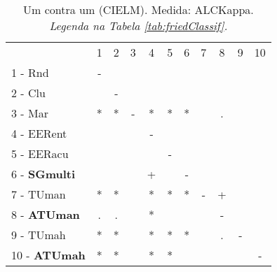 \begin{table}[h]
\caption{Um contra um (CIELM). Medida: ALCKappa. \textit{Legenda na Tabela \ref{tab:friedClassif}.}}
\begin{center}\begin{tabular}{lcc|cc|cc|cc|cc}
 			& 1 & 2 & 3 & 4 & 5 & 6 & 7 & 8 & 9 & 10\\
1 - Rnd  	& - &   &   &   &   &   &   &   &   &   \\
2 - Clu  	&   & - &   &   &   &   &   &   &   &   \\ \hline
3 - Mar  	& * & * & - & * & * & * &   & . &   &   \\
4 - EERent	&   &   &   & - &   &   &   &   &   &   \\ \hline
5 - EERacu	&   &   &   &   & - &   &   &   &   &   \\
6 - \textbf{SGmulti}	&   &   &   & + &   & - &   &   &   &   \\ \hline
7 - TUman	& * & * &   & * & * & * & - & + &   &   \\
8 - \textbf{ATUman}	& . & . &   & * &   &   &   & - &   &   \\ \hline
9 - TUmah	& * & * &   & * & * & * &   & . & - &   \\
10 - \textbf{ATUmah}	& * & * &   & * & * &   &   &   &   & - \\ \hline\end{tabular}
\label{stratsALCKappaFriedCIELMRedux}
\end{center}
\end{table}